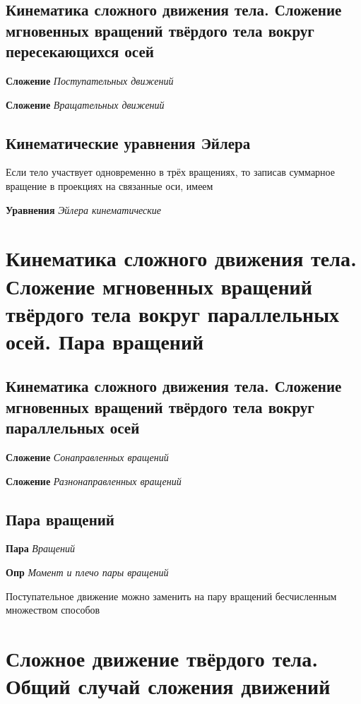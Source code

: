 \documentclass[a4paper, 14pt]{article}
\begin{document}
    \subsection{Кинематика сложного движения тела. Сложение мгновенных вращений твёрдого тела вокруг пересекающихся
    осей}
    
    \textbf{Сложение} \textit{Поступательных движений}
    
    \textbf{Сложение} \textit{Вращательных движений}
    
    \subsection{Кинематические уравнения Эйлера}
    
    Если тело участвует одновременно в трёх вращениях, то записав суммарное вращение в проекциях на связанные оси, имеем
    
    \textbf{Уравнения} \textit{Эйлера кинематические}
    
    \section{Кинематика сложного движения тела.
    Сложение мгновенных вращений твёрдого тела вокруг параллельных осей.
    Пара вращений}
    
    \subsection{Кинематика сложного движения тела. Сложение мгновенных вращений твёрдого тела вокруг параллельных осей}
    
    \textbf{Сложение} \textit{Сонаправленных вращений}
    
    \textbf{Сложение} \textit{Разнонаправленных вращений}
    
    \subsection{Пара вращений}
    
    \textbf{Пара} \textit{Вращений}
    
    \textbf{Опр} \textit{Момент и плечо пары вращений}
    
    Поступательное движение можно заменить на пару вращений бесчисленным множеством способов
    
    \section{Сложное движение твёрдого тела.
    Общий случай сложения движений}
    
\end{document}
